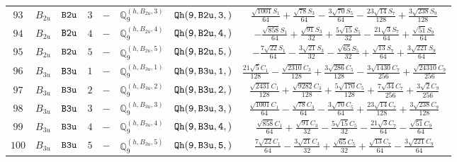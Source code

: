\documentclass[fleqn,8pt]{jsarticle}
\begin{document}
\begin{table}[ht!]
\begin{center}
\begin{tabular}{cccccccc}
$ 93 $ & $ B_{2u} $ & $ {\tt B2u} $ & $ 3 $ & $ - $ & $ \mathbb{Q}_{9}^{(h,B_{2u},3)} $ & $ {\tt Qh(9,B2u,3,)} $ & $ \frac{\sqrt{1001} S_{1}}{64} + \frac{\sqrt{78} S_{3}}{64} - \frac{3 \sqrt{70} S_{5}}{64} - \frac{23 \sqrt{14} S_{7}}{128} + \frac{3 \sqrt{238} S_{9}}{128} $ \\
$ 94 $ & $ B_{2u} $ & $ {\tt B2u} $ & $ 4 $ & $ - $ & $ \mathbb{Q}_{9}^{(h,B_{2u},4)} $ & $ {\tt Qh(9,B2u,4,)} $ & $ - \frac{\sqrt{858} S_{1}}{64} + \frac{\sqrt{91} S_{3}}{32} + \frac{5 \sqrt{15} S_{5}}{32} - \frac{21 \sqrt{3} S_{7}}{64} + \frac{\sqrt{51} S_{9}}{64} $ \\
$ 95 $ & $ B_{2u} $ & $ {\tt B2u} $ & $ 5 $ & $ - $ & $ \mathbb{Q}_{9}^{(h,B_{2u},5)} $ & $ {\tt Qh(9,B2u,5,)} $ & $ - \frac{7 \sqrt{22} S_{1}}{64} - \frac{3 \sqrt{21} S_{3}}{32} - \frac{\sqrt{65} S_{5}}{32} + \frac{\sqrt{13} S_{7}}{64} + \frac{3 \sqrt{221} S_{9}}{64} $ \\
$ 96 $ & $ B_{3u} $ & $ {\tt B3u} $ & $ 1 $ & $ - $ & $ \mathbb{Q}_{9}^{(h,B_{3u},1)} $ & $ {\tt Qh(9,B3u,1,)} $ & $ \frac{21 \sqrt{5} C_{1}}{128} - \frac{\sqrt{2310} C_{3}}{128} + \frac{3 \sqrt{286} C_{5}}{128} - \frac{3 \sqrt{1430} C_{7}}{256} + \frac{\sqrt{24310} C_{9}}{256} $ \\
$ 97 $ & $ B_{3u} $ & $ {\tt B3u} $ & $ 2 $ & $ - $ & $ \mathbb{Q}_{9}^{(h,B_{3u},2)} $ & $ {\tt Qh(9,B3u,2,)} $ & $ \frac{\sqrt{2431} C_{1}}{128} + \frac{\sqrt{9282} C_{3}}{128} + \frac{5 \sqrt{170} C_{5}}{128} + \frac{7 \sqrt{34} C_{7}}{256} + \frac{3 \sqrt{2} C_{9}}{256} $ \\
$ 98 $ & $ B_{3u} $ & $ {\tt B3u} $ & $ 3 $ & $ - $ & $ \mathbb{Q}_{9}^{(h,B_{3u},3)} $ & $ {\tt Qh(9,B3u,3,)} $ & $ \frac{\sqrt{1001} C_{1}}{64} - \frac{\sqrt{78} C_{3}}{64} - \frac{3 \sqrt{70} C_{5}}{64} + \frac{23 \sqrt{14} C_{7}}{128} + \frac{3 \sqrt{238} C_{9}}{128} $ \\
$ 99 $ & $ B_{3u} $ & $ {\tt B3u} $ & $ 4 $ & $ - $ & $ \mathbb{Q}_{9}^{(h,B_{3u},4)} $ & $ {\tt Qh(9,B3u,4,)} $ & $ \frac{\sqrt{858} C_{1}}{64} + \frac{\sqrt{91} C_{3}}{32} - \frac{5 \sqrt{15} C_{5}}{32} - \frac{21 \sqrt{3} C_{7}}{64} - \frac{\sqrt{51} C_{9}}{64} $ \\
$ 100 $ & $ B_{3u} $ & $ {\tt B3u} $ & $ 5 $ & $ - $ & $ \mathbb{Q}_{9}^{(h,B_{3u},5)} $ & $ {\tt Qh(9,B3u,5,)} $ & $ \frac{7 \sqrt{22} C_{1}}{64} - \frac{3 \sqrt{21} C_{3}}{32} + \frac{\sqrt{65} C_{5}}{32} + \frac{\sqrt{13} C_{7}}{64} - \frac{3 \sqrt{221} C_{9}}{64} $ \\
 \hline \hline
\end{tabular}
\end{center}
\end{table}
\end{document}
